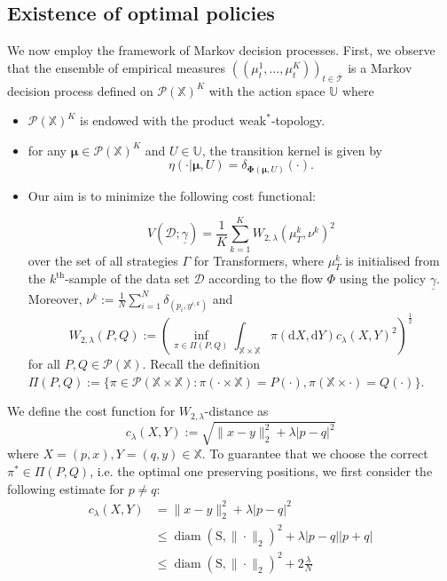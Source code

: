 \documentclass[11pt]{article}
\newcommand{\XX}{\mathbb{X}}
\newcommand{\UU}{\mathbb{U}}
\newcommand{\cD}{\mathcal{D}}
\newcommand{\cP}{\mathcal{P}}
\newcommand{\cT}{\mathcal{T}}
\newcommand{\de}{\mathrm{d}} %
\begin{document}
\subsection{Existence of optimal policies}\label{sub:existence-of-optimality}
We now employ the framework of Markov decision processes. First, we observe that the ensemble of empirical measures $\left((\mu_t^1,\ldots,\mu_t^K)\right)_{t\in\overline{\cT}}$ is a Markov decision process defined on $\cP(\XX)^K$ with the action space $\UU$ where
\begin{itemize}
    \item $\cP(\XX)^K$ is endowed with the product $\text{weak}^*$-topology.
    \item for any $\bm{\mu}\in\cP(\XX)^K$ and $U\in\UU$, the transition kernel is given by
    \begin{equation}
    \eta(\cdot|\bm{\mu}, U) = \delta_{\bm{\Phi}(\bm{\mu}, U)}(\cdot).
    \end{equation}
    \item Our aim is to minimize the  following cost functional:

\begin{equation}\label{eq:cost-functional}
    V(\cD; \underline{\gamma}) =\frac{1}{K}\sum_{k=1}^K W_{2,\lambda}(\mu_T^k, \nu^k)^2
\end{equation}
over the set of all strategies $\Gamma$ for Transformers, where $\mu_T^k$ is initialised from the $k^{\text{th}}$-sample of the data set $\cD$ according to the flow $\Phi$ using the policy $\underline{\gamma}$. Moreover, $\nu^k := \frac{1}{N}\sum_{i=1}^N\delta_{(p_i,y^{i,k})}$ and
\begin{equation}
    W_{2,\lambda}(P, Q) := \left(  \inf_{\pi\in\Pi(P,Q)}\int_{\XX\times\XX}\pi(\de X, \de Y)c_\lambda(X,Y)^2 \right)^{\frac{1}{2}}
\end{equation}
for all $P,Q\in\cP(\XX)$. Recall the definition $\Pi(P,Q) := \{\pi\in\cP(\XX\times\XX) : \pi(\cdot \times \XX) = P(\cdot), \pi(\XX\times\cdot) = Q(\cdot)\}$.
\end{itemize}
We define the cost function for $W_{2,\lambda}$-distance as
\begin{equation*}
    c_\lambda(X,Y) := \sqrt{\|x-y\|_2^2 + \lambda |p-q|^2}
\end{equation*}
where $X=(p,x), Y=(q,y)\in\XX$. To guarantee that we choose the correct $\pi^*\in\Pi(P,Q)$, i.e. the optimal one preserving positions, we first consider the following estimate for $p\neq q$:
\begin{align*}
    c_\lambda(X, Y) &= \|x-y\|_2^2 + \lambda |p-q|^2 \\
    &\leq \operatorname{diam}(\mathrm{S}, \|\cdot\|_2)^2 + \lambda|p-q||p+q|\\
    &\leq \operatorname{diam}(\mathrm{S}, \|\cdot\|_2)^2 + 2\frac{\lambda}{N}
\end{align*}
\end{document}
